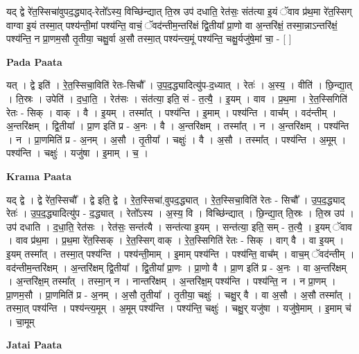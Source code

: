 \documentclass[17pt]{extarticle}
\begin{document}
यद् द्वे रे॑त॒स्सिचा॑वुपद॒द्ध्याद्-रेतो᳚ऽस्य॒ विच्छि॑न्द्यात् ति॒स्र उप॑ दधाति॒ रेत॑सः॒ संत॑त्या इ॒यं ॅवाव प्र॑थ॒मा रे॑त॒स्सिग् वाग्वा इ॒यं तस्मा॒त् पश्य॑न्ती॒मां पश्य॑न्ति॒ वाचं॒ ॅवद॑न्तीम॒न्तरि॑क्षं द्वि॒तीया᳚ प्रा॒णो वा अ॒न्तरि॑क्षं॒ तस्मा॒न्नाऽन्तरि॑क्षं॒ पश्य॑न्ति॒ न प्रा॒णम॒सौ तृ॒तीया॒ चक्षु॒र्वा अ॒सौ तस्मा॒त् पश्य॑न्त्य॒मूं पश्य॑न्ति॒ चक्षु॒र्यजु॑षे॒मां चा॒ - [  ] \newline

\textbf{Pada Paata} \newline

यत् । द्वे इति॑ । रे॒त॒स्सिचा॒विति॑ रेतः-सिचौ᳚ । उ॒प॒द॒द्ध्यादित्यु॑प-द॒ध्यात् । रेतः॑ । अ॒स्य॒ । वीति॑ । छि॒न्द्या॒त् । ति॒स्रः । उपेति॑ । द॒धा॒ति॒ । रेत॑सः । संत॑त्या॒ इति॒ सं - त॒त्यै॒ । इ॒यम् । वाव । प्र॒थ॒मा । रे॒त॒स्सिगिति॑ रेतः - सिक् । वाक् । वै । इ॒यम् । तस्मा᳚त् । पश्य॑न्ति । इ॒माम् । पश्य॑न्ति । वाच᳚म् । वद॑न्तीम् । अ॒न्तरि॑क्षम् । द्वि॒तीया᳚ । प्रा॒ण इति॑ प्र - अ॒नः । वै । अ॒न्तरि॑क्षम् । तस्मा᳚त् । न । अ॒न्तरि॑क्षम् । पश्य॑न्ति । न । प्रा॒णमिति॑ प्र - अ॒नम् । अ॒सौ । तृ॒तीया᳚ ।   चक्षुः॑ । वै । अ॒सौ । तस्मा᳚त् । पश्य॑न्ति । अ॒मूम् । पश्य॑न्ति । चक्षुः॑ । यजु॑षा । इ॒माम् । च॒ ।  \newline


\textbf{Krama Paata} \newline

यद् द्वे । द्वे रे॑त॒स्सिचौ᳚ । द्वे इति॒ द्वे । रे॒त॒स्सिचा॑,वुपद॒द्ध्यात् । रे॒त॒स्सिचा॒विति॑ रेतः - सिचौ᳚ । उ॒प॒द॒द्ध्याद् रेतः॑ । उ॒प॒द॒द्ध्यादित्यु॑प - द॒द्ध्यात् । रेतो᳚ऽस्य । अ॒स्य॒ वि । विच्छि॑न्द्यात् । छि॒न्द्या॒त् ति॒स्रः । ति॒स्र उप॑ । उप॑ दधाति । द॒धा॒ति॒ रेत॑सः । रेत॑सः॒ सन्त॑त्यै । सन्त॑त्या इ॒यम् । सन्त॑त्या॒ इति॒ सम् - त॒त्यै॒ । इ॒यम् ॅवाव । वाव प्र॑थ॒मा । प्र॒थ॒मा रे॑त॒स्सिक् । रे॒त॒स्सिग् वाक् । रे॒त॒स्सिगिति॑ रेतः - सिक् । वाग् वै । वा इ॒यम् । इ॒यम् तस्मा᳚त् । तस्मा॒त् पश्य॑न्ति । पश्य॑न्ती॒माम् । इ॒माम् पश्य॑न्ति । पश्य॑न्ति॒ वाच᳚म् । वाच॒म् ॅवद॑न्तीम् । वद॑न्तीम॒न्तरि॑क्षम् । अ॒न्तरि॑क्षम् द्वि॒तीया᳚ । द्वि॒तीया᳚ प्रा॒णः । प्रा॒णो वै । प्रा॒ण इति॑ प्र - अ॒नः । वा अ॒न्तरि॑क्षम् । अ॒न्तरि॑क्ष॒म् तस्मा᳚त् । तस्मा॒न् न । नान्तरि॑क्षम् । अ॒न्तरि॑क्ष॒म् पश्य॑न्ति । पश्य॑न्ति॒ न । न प्रा॒णम् । प्रा॒णम॒सौ । प्रा॒णमिति॑ प्र - अ॒नम् । अ॒सौ तृ॒तीया᳚ । तृ॒तीया॒ चक्षुः॑ । चक्षु॒र् वै । वा अ॒सौ । अ॒सौ तस्मा᳚त् । तस्मा॒त् पश्य॑न्ति । पश्य॑न्त्य॒मूम् । अ॒मूम् पश्य॑न्ति । पश्य॑न्ति॒ चक्षुः॑ । चक्षु॒र् यजु॑षा । यजु॑षे॒माम् । इ॒माम् च॑ । चा॒मूम् \newline

\textbf{Jatai Paata} \newline
\end{document}
